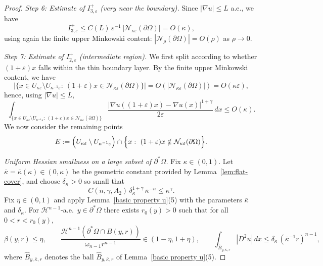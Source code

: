 \documentclass[reqno,11pt]{amsart}
\numberwithin{equation}{section}
\theoremstyle{remark}
\begin{document}
\begin{proof}
\medskip
\noindent\textit{Step 6: Estimate of $I_{3,\varepsilon}^+$ (very near the boundary).}
Since $|\nabla u|\le L$ a.e., we have
\[
I_{3,\varepsilon}^+\le C(L)\,\varepsilon^{-1}\,|\mathcal N_{\kappa\varepsilon}(\partial\Omega)|
=O(\kappa),
\]
using again the finite upper Minkowski content: $|\mathcal N_{\rho}(\partial\Omega)|=O(\rho)$ as $\rho\to 0$.


\medskip
\noindent\textit{Step 7: Estimate of $I^+_{2,\varepsilon}$ (intermediate region).}
We first split according to whether $(1+\varepsilon)x$ falls within the thin boundary layer.
By the finite upper Minkowski content, we have
\[
\bigl|\{x\in U_{\kappa\varepsilon}\setminus U_{\kappa^{-1}\varepsilon}:\ (1+\varepsilon)x\in \mathcal N_{\kappa\varepsilon}(\partial\Omega)\}\bigr|
=O(|\mathcal N_{\kappa\varepsilon}(\partial\Omega)|)=O(\kappa\varepsilon),
\]
hence, using $|\nabla u|\le L$,
\begin{equation}\label{2.7}
\int_{\{x\in U_{\kappa\varepsilon}\setminus U_{\kappa^{-1}\varepsilon}:\ (1+\varepsilon)x\in \mathcal N_{\kappa\varepsilon}(\partial\Omega)\}}
\frac{|\nabla u((1+\varepsilon)x)-\nabla u(x)|^{1+\gamma}}{2\varepsilon}\,dx
\le O(\kappa).
\end{equation}
We now consider the remaining points
\[
E:=\Bigl(U_{\kappa\varepsilon}\setminus U_{\kappa^{-1}\varepsilon}\Bigr)\cap\Bigl\{x:\ (1+\varepsilon)x\notin \mathcal N_{\kappa\varepsilon}(\partial\Omega)\Bigr\}.
\]

\smallskip
\noindent\emph{Uniform Hessian smallness on a large subset of $\partial^*\Omega$.}
{Fix $\kappa\in(0,1)$. Let $\bar\kappa=\bar\kappa(\kappa)\in(0,\kappa)$ be the geometric constant provided by
Lemma~\ref{lem:flat-cover}, and choose $\delta_\kappa>0$ so small that}
\begin{equation}\label{eq:deltakappa}
{
C(n,\gamma,A_2)\,\delta_\kappa^{1+\gamma}\,\bar\kappa^{-n}\le \kappa^\gamma .
}
\end{equation}
{Fix $\eta\in(0,1)$ and apply Lemma~\ref{basic property u}(5) with the parameters $\bar\kappa$ and
$\delta_\kappa$. For $\mathscr H^{n-1}$-a.e.\ $y\in\partial^*\Omega$ there exists $r_0(y)>0$ such that for all
$0<r<r_0(y)$,}
\begin{equation}\label{three inequ}
{
\beta(y,r)\le\eta,\qquad 
\frac{\mathscr H^{n-1}(\partial^*\Omega\cap B(y,r))}{\omega_{n-1}r^{n-1}}\in(1-\eta,1+\eta),
\qquad
\int_{\widehat B_{y,\bar\kappa,r}}|D^2u|\,dx \le \delta_\kappa\,(\bar\kappa^{-1}r)^{n-1},
}
\end{equation}
{where $\widehat B_{y,\bar\kappa,r}$ denotes the ball $\hat B_{y,\bar\kappa,r}$ of Lemma~\ref{basic property u}(5).}


\end{proof}
\end{document}
